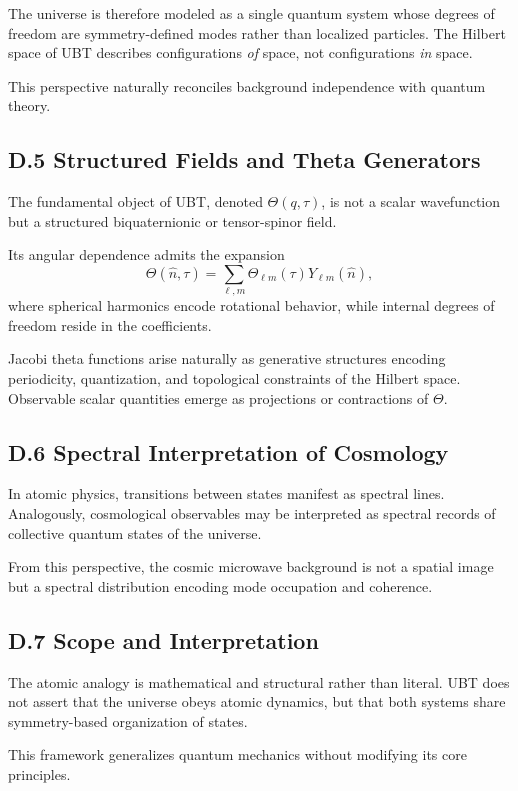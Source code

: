 The universe is therefore modeled as a single quantum system whose degrees of freedom are symmetry-defined modes rather than localized particles. The Hilbert space of UBT describes configurations \emph{of} space, not configurations \emph{in} space.

This perspective naturally reconciles background independence with quantum theory.

\subsection*{D.5 Structured Fields and Theta Generators}

The fundamental object of UBT, denoted $\Theta(q,\tau)$, is not a scalar wavefunction but a structured biquaternionic or tensor-spinor field.

Its angular dependence admits the expansion
\[
\Theta(\hat n,\tau)=\sum_{\ell,m}\Theta_{\ell m}(\tau)Y_{\ell m}(\hat n),
\]
where spherical harmonics encode rotational behavior, while internal degrees of freedom reside in the coefficients.

Jacobi theta functions arise naturally as generative structures encoding periodicity, quantization, and topological constraints of the Hilbert space. Observable scalar quantities emerge as projections or contractions of $\Theta$.

\subsection*{D.6 Spectral Interpretation of Cosmology}

In atomic physics, transitions between states manifest as spectral lines. Analogously, cosmological observables may be interpreted as spectral records of collective quantum states of the universe.

From this perspective, the cosmic microwave background is not a spatial image but a spectral distribution encoding mode occupation and coherence.

\subsection*{D.7 Scope and Interpretation}

The atomic analogy is mathematical and structural rather than literal. UBT does not assert that the universe obeys atomic dynamics, but that both systems share symmetry-based organization of states.

This framework generalizes quantum mechanics without modifying its core principles.

